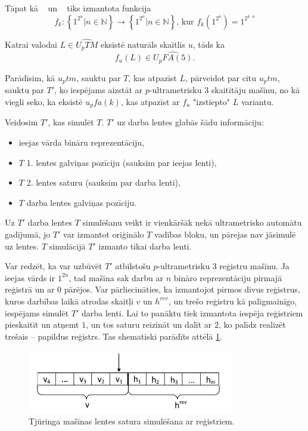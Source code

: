 \documentclass{ludis}
\begin{document}
Tāpat kā ~\citep{Macarie1995} un ~\citep{Monien1980} tiks izmantota funkcija
\[
	f_k : \left\{ 1^{2^n} | n \in \mathbb{N} \right\} \rightarrow \left\{ 1^{2^n} | n \in \mathbb{N} \right\} \textrm{, kur } f_k( 1^{2^n}) = 1^{2^{k \cdot n}}
\]

\begin{lemma} \label{skaititaji}
Katrai valodai $L \in \widehat{U_pTM}$ eksistē naturāls skaitlis $u$, tāds ka
\[
	f_u(L) \in \widehat{U_pFA(5)}.
\]
\end{lemma}
\begin{pieradijums}
Parādīsim, kā $u_ptm$, sauktu par $T$, kas atpazīst $L$, pārveidot par citu $u_ptm$, sauktu par $T'$, ko iespējams aizstāt ar $p$-ultrametrisku $3$ skaitītāju mašīnu, no kā viegli seko, ka eksistē $u_pfa(k)$, kas atpazīst ar $f_u$ "izstiepto" $L$ variantu.

Veidosim $T'$, kas simulēt $T$. $T'$ uz darba lentes glabās šādu informāciju:
\begin{itemize}
	\item ieejas vārda bināru reprezentāciju,
	\item $T$ 1. lentes galviņas pozīciju (sauksim par ieejas lenti),
	\item $T$ 2. lentes saturu (sauksim par darba lenti), %
	\item $T$ darba lentes galviņas pozīciju.
\end{itemize} %
Uz $T'$ darba lentes $T$ simulēšanu veikt ir vienkāršāk nekā ultrametrisko automātu gadījumā, jo $T'$ var izmantot oriģinālo $T$ vadības bloku, un pārejas nav jāsimulē uz lentes. $T$ simulācijā $T'$ izmanto tikai darba lenti.

Var redzēt, ka var uzbūvēt $T'$ atbilstošu $p$-ultrametrisku $3$ reģistru mašīnu. Ja ieejas vārds ir $1^{2n}$, tad mašīna sak darbu ar $n$ bināro reprezentāciju pirmajā reģistrā un ar $0$ pārējos. Var pārliecināties, ka izmantojot pirmos divus reģistrus, kuros darbības laikā atrodas skaitļi $v$ un $h^{rev}$, un trešo reģistru kā palīgmainīgo, iespējams simulēt $T'$ darba lenti. Lai to panāktu tiek izmantota iespēja reģistriem pieskaitīt un atņemt $1$, un tos saturu reizināt un dalīt ar $2$, ko palīdz realizēt trešais -- papildus reģistrs. Tas shematiski parādīts attēlā \ref{fig:skaititaji}.

\begin{figure}[h!]
\centering
\includegraphics[width=0.8\textwidth]{Img/skaititaji.pdf}
\caption{Tjūringa mašīnas lentes satura simulēšana ar reģistriem.}
\label{fig:skaititaji}
\end{figure}


\end{pieradijums}
\end{document}
